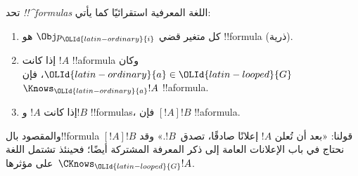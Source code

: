 \documentclass[../../../include/open-logic-section]{subfiles}
\begin{document}
\begin{defn}
  تحد \emph{!!^{formula}s} اللغة المعرفية استقرائيًا كما يأتي:
  \begin{enumerate}


  \item كل متغير قضي $\Obj p_\OLId{latin-ordinary}{i}$ هو !!{formula} (ذرية).






  \item إذا كانت $!A$ !!a{formula} وكان $\OLId{latin-ordinary}{a} \in \OLId{latin-looped}{G}$، فإن $\Knows_\OLId{latin-ordinary}{a} !A$
  !!a{formula}.
  
  \item إذا كانت $!A$ و$!B$ !!{formula}s، فإن $[!A] !B$ !!a{formula}.

\end{enumerate}
\end{defn}

والمقصود بال!!{formula} $[!A] !B$ قولنا: «بعد أن تُعلن $!A$ إعلانًا
صادقًا، تصدق~$!B$.» وقد نحتاج في باب الإعلانات العامة إلى ذكر المعرفة
المشتركة أيضًا؛ فحينئذ تشتمل اللغة على مؤثرها~$\CKnows_\OLId{latin-looped}{G} !A$.
\end{document}
